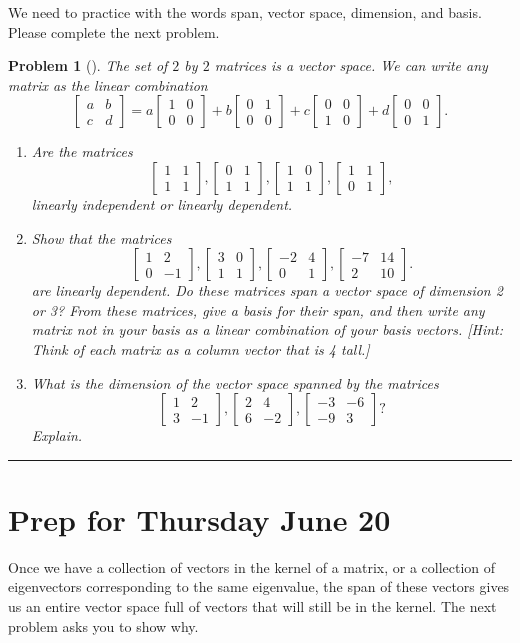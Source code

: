 \documentclass[letterpaper,oneside]{book}%
\theoremstyle{plain}
\theoremstyle{box}
\theoremstyle{problem}
\newtheorem{problemnum}{Problem}[chapter]
\newenvironment{problem}[1][]{\begin{problemnum}[#1]}{\end{problemnum}\nopagebreak\hrule\bigskip}
\newcommand{\bvec}[1]{\begin{bmatrix} #1 \end{bmatrix}}
\begin{document}
We need to practice with the words span, vector space, dimension, and basis.  Please complete the next problem. 

\begin{problem}
The set of $2$ by $2$ matrices is a vector space. We can write any matrix as the linear combination
$$\bvec{a&b\\c&d} 
= 
a\bvec{1&0\\0&0}
+b\bvec{0&1\\0&0}
+c\bvec{0&0\\1&0}
+d\bvec{0&0\\0&1}
.
$$
\begin{enumerate}
 \item Are the matrices 
$$
 \bvec{1&1\\1&1}, 
 \bvec{0&1\\1&1}, 
 \bvec{1&0\\1&1}, 
 \bvec{1&1\\0&1}, 
$$
linearly independent or linearly dependent. 
 \item Show that the matrices
$$
 \bvec{1&2\\0&-1}, 
 \bvec{3&0\\1&1}, 
 \bvec{-2&4\\0&1}, 
 \bvec{-7&14\\2&10}. 
$$
are linearly dependent. Do these matrices span a vector space of dimension 2 or 3? From these matrices, give a basis for their span, and then write any matrix not in your basis as a linear combination of your basis vectors. [Hint: Think of each matrix as a column vector that is 4 tall.]
 \item What is the dimension of the vector space spanned by the matrices
$$
 \bvec{1&2\\3&-1}, 
 \bvec{2&4\\6&-2}, 
 \bvec{-3&-6\\-9&3}? 
$$
Explain.
\end{enumerate}

\end{problem}




\section{Prep for Thursday June 20}


 
 Once we have a collection of vectors in the kernel of a matrix, or a collection of eigenvectors corresponding to the same eigenvalue, the span of these vectors gives us an entire vector space full of vectors that will still be in the kernel. The next problem asks you to show why.
 
\end{document}
